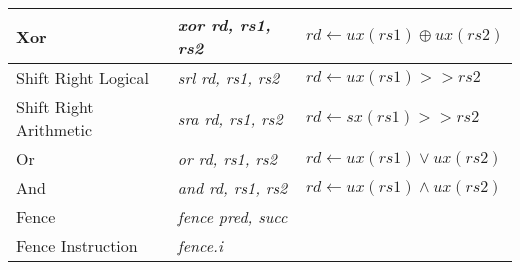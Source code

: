 \begin{longtable}{|m{3.5cm}<{\raggedright} |m{3cm}<{\raggedright} |m{5.5cm}<{\raggedright} |}
\hline
Xor & \textit{xor rd, rs1, rs2} & $rd \leftarrow ux(rs1) \oplus ux(rs2)$ \\
\hline
Shift Right Logical & \textit{srl rd, rs1, rs2} & $rd \leftarrow ux(rs1) >> rs2$ \\
\hline
Shift Right Arithmetic & \textit{sra rd, rs1, rs2} & $rd \leftarrow sx(rs1) >> rs2$ \\
\hline
Or & \textit{or rd, rs1, rs2} & $rd \leftarrow ux(rs1) \vee ux(rs2)$ \\
\hline
And & \textit{and rd, rs1, rs2} & $rd \leftarrow ux(rs1) \wedge ux(rs2)$ \\
\hline
Fence & \textit{fence pred, succ} &  \\
\hline
Fence Instruction & \textit{fence.i } & 
\label{tab:asAlu05}
\end{longtable}
